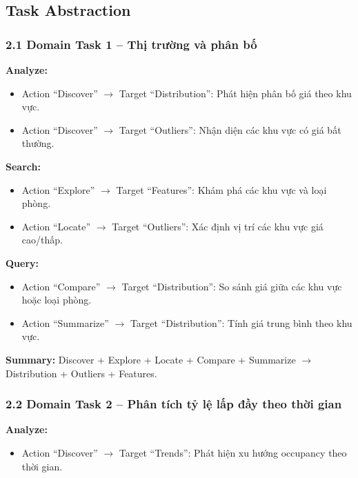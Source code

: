 \subsection{Task Abstraction}

\subsubsection*{2.1 Domain Task 1 -- Thị trường và phân bố}

\textbf{Analyze:} 
\begin{itemize}
    \item Action ``Discover'' $\rightarrow$ Target ``Distribution'': Phát hiện phân bố giá theo khu vực. 
    \item Action ``Discover'' $\rightarrow$ Target ``Outliers'': Nhận diện các khu vực có giá bất thường.
\end{itemize}

\textbf{Search:} 
\begin{itemize}
    \item Action ``Explore'' $\rightarrow$ Target ``Features'': Khám phá các khu vực và loại phòng. 
    \item Action ``Locate'' $\rightarrow$ Target ``Outliers'': Xác định vị trí các khu vực giá cao/thấp.
\end{itemize}

\textbf{Query:} 
\begin{itemize}
    \item Action ``Compare'' $\rightarrow$ Target ``Distribution'': So sánh giá giữa các khu vực hoặc loại phòng. 
    \item Action ``Summarize'' $\rightarrow$ Target ``Distribution'': Tính giá trung bình theo khu vực.
\end{itemize}

\textbf{Summary:} Discover + Explore + Locate + Compare + Summarize $\rightarrow$ Distribution + Outliers + Features.

\subsubsection*{2.2 Domain Task 2 -- Phân tích tỷ lệ lấp đầy theo thời gian}

\textbf{Analyze:} 
\begin{itemize}
    \item Action ``Discover'' $\rightarrow$ Target ``Trends'': Phát hiện xu hướng occupancy theo thời gian.
\end{itemize}

